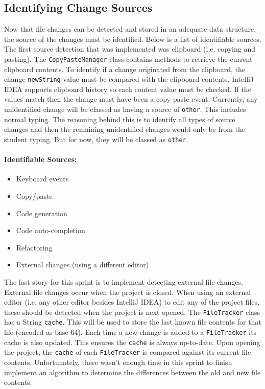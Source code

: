 \subsection{Identifying Change Sources}
Now that file changes can be detected and stored in an adequate data structure, the source of the changes must be identified. Below is a list of identifiable sources. The first source detection that was implemented was clipboard (i.e. copying and pasting). The \texttt{CopyPasteManager} class contains methods to retrieve the current clipboard contents. To identify if a change originated from the clipboard, the change \texttt{newString} value must be compared with the clipboard contents. IntelliJ IDEA supports clipboard history so each content value must be checked. If the values match then the change must have been a copy-paste event. Currently, any unidentified change will be classed as having a source of \texttt{other}. This includes normal typing. The reasoning behind this is to identify all types of source changes and then the remaining unidentified changes would only be from the student typing. But for now, they will be classed as \texttt{other}.

\paragraph{Identifiable Sources:}
\begin{itemize}
  \item Keyboard events
  \item Copy/paste
  \item Code generation
  \item Code auto-completion
  \item Refactoring
  \item External changes (using a different editor)
\end{itemize}

The last story for this sprint is to implement detecting external file changes. External file changes occur when the project is closed. When using an external editor (i.e. any other editor besides IntelliJ IDEA) to edit any of the project files, these should be detected when the project is next opened. The \texttt{FileTracker} class has a String \texttt{cache}. This will be used to store the last known file contents for that file (encoded as base-64). Each time a new change is added to a \texttt{FileTracker} its cache is also updated. This ensures the \texttt{cache} is always up-to-date. Upon opening the project, the \texttt{cache} of each \texttt{FileTracker} is compared against its current file contents. Unfortunately, there wasn't enough time in this sprint to finish implement an algorithm to determine the differences between the old and new file contents.

